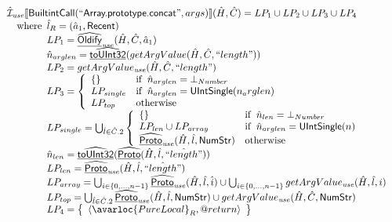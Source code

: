 \[\begin{array}{l}
\aI_{\it use}\lbr \SF{BuiltintCall}(``\SF{Array.prototype.concat}",args)\rbr(\hat{H},\hat{C}) = LP_1 \cup LP_2 \cup LP_3 \cup LP_4\\
\quad\wherec{
  \hat{l}_R = (\hat{a}_1, \SF{Recent})\\
  LP_1 = \ahf{Oldify}_{\it use}(\hat{H},\hat{C}, \hat{a}_1)\\
  \hat{n}_{arglen} = \ahf{toUInt32}(getArgValue(\hat{H},\hat{C}, ``length"))\\
  LP_2 = getArgValue_{\it use}(\hat{H},\hat{C}, ``length")\\
  LP_3 = \left\{\begin{array}{ll}
      \set{} & \ifc{\hat{n}_{arglen} = \bot_{Number}}\\
      LP_{single} & \ifc{\hat{n}_{arglen} = \SF{UIntSingle}(n_arglen)}\\
      LP_{top} & \owc
    \end{array}\right.\\
  LP_{single} = \bigcup_{\hat{l} \in \hat{C}.2} \left\{\begin{array}{ll}
      \set{} & \ifc{\hat{n}_{len} = \bot_{Number}}\\
      LP_{len} \cup LP_{array} & \ifc{\hat{n}_{arglen} = \SF{UIntSingle}(n)}\\
      \ahf{Proto}_{\it use}(\hat{H}, \hat{l}, \SF{NumStr})  & \owc
    \end{array}\right.\\
  \hat{n}_{len} = \ahf{toUInt32}(\ahf{Proto}(\hat{H}, \hat{l}, \hat{``length"}))\\
  LP_{len} = \ahf{Proto}_{\it use}(\hat{H}, \hat{l}, \hat{``length"})\\
  LP_{array} = \bigcup_{i \in \{0,...,n-1\}} \ahf{Proto}_{\it use}(\hat{H}, \hat{l}, \hat{i}) \cup
    \bigcup_{i \in \{0,...,n-1\}} getArgValue_{\it use}(\hat{H}, \hat{l}, i)\\
  LP_{top} =  \bigcup_{\hat{l} \in \hat{C}.2} \ahf{Proto}_{\it use}(\hat{H}, \hat{l}, \SF{NumStr}) \cup getArgValue_{\it use}(\hat{H}, \hat{C}, \SF{NumStr})\\

  LP_4 = \set{\langle\avarloc{PureLocal}_R,\varprop{return}\rangle}\\
  }\\
\\



\end{array}\]
